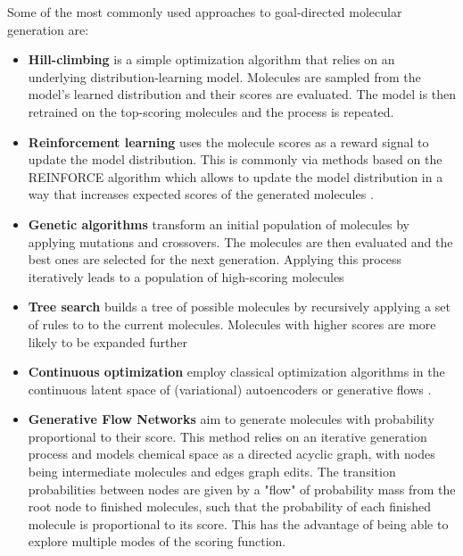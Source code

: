 Some of the most commonly used approaches to goal-directed molecular generation are:
\begin{itemize}
      \item \textbf{Hill-climbing}
            \citep{seglerGeneratingFocusedMolecule2018,xieMARSMarkovMolecular2021,thomasAugmentedHillClimbIncreases2022}
            is a simple optimization algorithm that relies on an underlying distribution-learning model.
            Molecules are sampled from the model's learned distribution and their scores are evaluated.
            The model is then retrained on the top-scoring molecules and the process is repeated.
      \item \textbf{Reinforcement learning} uses the molecule scores as a reward signal to update
            the model distribution. This is commonly via methods based on the REINFORCE algorithm
            \citep{williamsSimpleStatisticalGradientfollowing1992} which allows to update the model
            distribution in a way that increases expected scores of the generated molecules
            \citep{olivecronaMolecularDenovoDesign2017,thomasAugmentedHillClimbIncreases2022,youGraphConvolutionalPolicy2019,guoAugmentedMemoryCapitalizing2023}.
      \item \textbf{Genetic algorithms} transform an initial population of molecules by applying
            mutations and crossovers. The molecules are then evaluated and the best ones are
            selected for the next generation. Applying this process iteratively leads to a
            population of high-scoring molecules \citep{jensenGraphbasedGeneticAlgorithm2019,nigamGenerativeModelsSuperfast2021,yoshikawaPopulationbasedNovoMolecule2018}
      \item \textbf{Tree search} builds a tree of possible molecules by recursively applying a set
            of rules to to the current molecules. Molecules with higher scores are more likely to be
            expanded further \citep{yangChemTSEfficientPython2017,jensenGraphbasedGeneticAlgorithm2019}
      \item \textbf{Continuous optimization} employ classical optimization algorithms in the continuous
            latent space of (variational) autoencoders
            \citep{winterEfficientMultiobjectiveMolecular2019,gomez-bombarelliAutomaticChemicalDesign2018,kusnerGrammarVariationalAutoencoder2017}
            or generative flows \citep{madhawaGraphNVPInvertibleFlow2019}.
      \item \textbf{Generative Flow Networks} \citep{bengioFlowNetworkBased2021} aim to generate
            molecules with probability proportional to their score. This method relies on an
            iterative generation process and models chemical space as a directed acyclic graph, with
            nodes being intermediate molecules and edges graph edits. The transition probabilities
            between nodes are given by a "flow" of probability mass from the root node to finished
            molecules, such that the probability of each finished molecule is proportional to its
            score. This has the advantage of being able to explore multiple modes of the scoring
            function.
\end{itemize}

